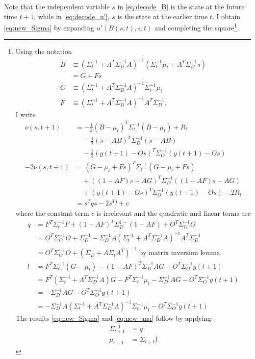 \documentclass[12pt]{article}
\newcommand{\ti}[2]{{#1}{(#2)}}                         %
\begin{document}
Note that the independent variable $s$ in \eqref{eq:decode_B} is the
state at the future time $t+1$, while in \eqref{eq:decode_u'}, $s$ is
the state at the earlier time $t$.  I obtain \eqref{eq:new_Sigma} by
expanding $u'(B(s,t),s,t)$ and completing the square\footnote{Using
  the notation
  \begin{align*}
    B &\equiv \left( \Sigma_t^{-1} + A^T \Sigma_D^{-1} A \right)^{-1}
  \left( \Sigma_t^{-1} \mu_t + A^T \Sigma_D^{-1} s \right) \\
  &= G + Fs \\
  G &\equiv \left( \Sigma_t^{-1} + A^T \Sigma_D^{-1} A \right)^{-1}
  \Sigma_t^{-1} \mu_t \\
  F &\equiv  \left( \Sigma_t^{-1} + A^T \Sigma_D^{-1} A \right)^{-1}
  A^T \Sigma_D^{-1},
  \end{align*}
  I write
  \begin{align*}
    \nu(s,t+1) &=  -\frac{1}{2}(B-\mu_{t})^T \Sigma_{t}^{-1}
    (B-\mu_{t}) + R_t\\
    &\quad - \frac{1}{2} (s-AB)^T \Sigma_{D}^{-1} (s-AB)\\
    &\quad - \frac{1}{2}(\ti{y}{t+1}-O s)^T \Sigma_{O}^{-1}
    (\ti{y}{t+1}-Os) \\
    -2 \nu(s,t+1) &= (G-\mu_{t}+Fs)^T \Sigma_{t}^{-1} (G-\mu_{t}+Fs) \\
    &\quad + ((1-AF)s-AG)^T \Sigma_{D}^{-1} ((1-AF)s-AG)\\
    &\quad + (\ti{y}{t+1}-O s)^T \Sigma_{O}^{-1} (\ti{y}{t+1}-Os) -2R_t \\
    &= s^T q s - 2s^T l + c
  \end{align*}
  where the constant term $c$ is irrelevant and the quadratic and
  linear terms are
  \begin{align*}
    q &= F^T\Sigma_t^{-1}F + (1-AF)^T\Sigma_D^{1-}(1-AF) +
    O^T\Sigma_O^{-1}O \\
    &= O^T\Sigma_O^{-1}O + \Sigma_D^{-1} - \Sigma_D^{-1}A
    ( \Sigma_t^{-1} + A^T\Sigma_D^{-1}A )^{-1}A^T\Sigma_D^{-1}\\
    &= O^T\Sigma_O^{-1}O + (\Sigma_D + A \Sigma_t A^T)^{-1}
    \text{ by matrix inversion lemma} \\
    l &= F^T \Sigma_t^{-1}(G-\mu_t) - (1-AF)^T\Sigma_D^{-1}AG -
    O^T\Sigma_O^{-1}y(t+1)  \\
    &= F^T(\Sigma_t^{-1}+A^T\Sigma_D^{-1}A)G - F^T\Sigma_t^{-1}\mu_t -
    \Sigma_D^{-1}AG - O^T\Sigma_O^{-1}y(t+1) \\
    &= -\Sigma_D^{-1}AG - O^T\Sigma_O^{-1}y(t+1) \\
    &= -\Sigma_D^{-1}A \left( \Sigma_t^{-1} + A^T \Sigma_D^{-1} A
    \right)^{-1} \Sigma_t^{-1} \mu_t - O^T\Sigma_O^{-1}y(t+1)
  \end{align*}
  The results \eqref{eq:new_Sigma} and \eqref{eq:new_mu} follow by
  applying
  \begin{align*}
    \Sigma_{t+1}^{-1} &= q \\
    \mu_{t+1} &= \Sigma_{t+1} l
  \end{align*}

}.
\end{document}
